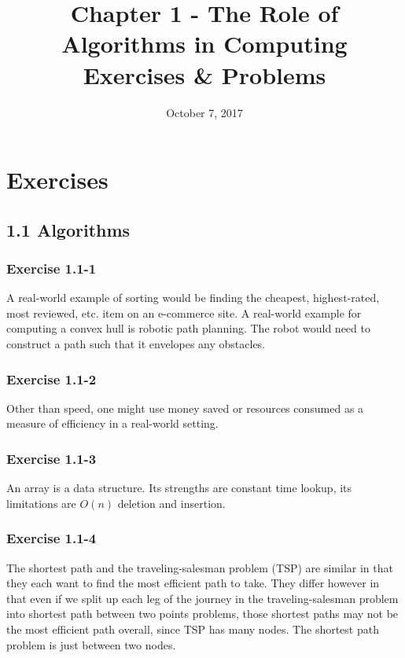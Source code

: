 \documentclass{article}
\title{Chapter 1 - The Role of Algorithms in Computing \\
Exercises \& Problems}
\date{October 7, 2017}
\begin{document}
\maketitle
{}

\section*{Exercises}

\subsection*{1.1 Algorithms}
\subsubsection*{Exercise 1.1-1}

A real-world example of sorting would be finding the cheapest, highest-rated, most reviewed, etc. item on an e-commerce site. A real-world example for computing a convex hull is robotic path planning. The robot would need to construct a path such that it envelopes any obstacles.

\subsubsection*{Exercise 1.1-2}

Other than speed, one might use money saved or resources consumed as a measure of efficiency in a real-world setting.

\subsubsection*{Exercise 1.1-3}

An array is a data structure. Its strengths are constant time lookup, its limitations are $O(n)$ deletion and insertion.

\subsubsection*{Exercise 1.1-4}

The shortest path and the traveling-salesman problem (TSP) are similar in that they each want to find the most efficient path to take. They differ however in that even if we split up each leg of the journey in the traveling-salesman problem into shortest path between two points problems, those shortest paths may not be the most efficient path overall, since TSP has many nodes. The shortest path problem is just between two nodes.
\end{document}

